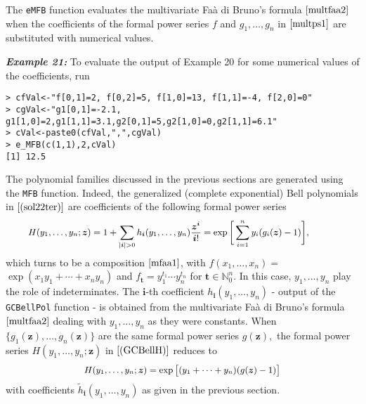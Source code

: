 The \texttt{eMFB} function evaluates the multivariate Faà di Bruno's
formula \(\eqref{multfaa2}\) when the coefficients of the formal power
series \(f\) and \(g_1, \ldots, g_n\) in \(\eqref{multps1}\) are
substituted with numerical values.

\hskip-0.5cm\textbf{\emph{Example 21:}} To evaluate the output of
Example 20 for some numerical values of the coefficients, run

\begin{verbatim}
> cfVal<-"f[0,1]=2, f[0,2]=5, f[1,0]=13, f[1,1]=-4, f[2,0]=0"
> cgVal<-"g1[0,1]=-2.1, g1[1,0]=2,g1[1,1]=3.1,g2[0,1]=5,g2[1,0]=0,g2[1,1]=6.1"
> cVal<-paste0(cfVal,",",cgVal)
> e_MFB(c(1,1),2,cVal)
[1] 12.5
\end{verbatim}

The polynomial families discussed in the previous sections are generated
using the \texttt{MFB} function. Indeed, the generalized (complete
exponential) Bell polynomials in \(\eqref{(sol22ter)}\) are coefficients
of the following formal power series \begin{equation}
\hskip-1cm{\small H(y_1, \ldots, y_n; \boldsymbol{z}) = 1 + \sum_{|\boldsymbol{i}| > 0} h_{\boldsymbol{i}}(y_1, \ldots, y_n) \frac{{\boldsymbol{z}}^{\boldsymbol{i}}}{\boldsymbol{i}!} = \exp \bigg[ \sum_{i=1}^n y_i (g_i(\boldsymbol{z})-1) \bigg]},
\label{(GCBellH)}
\end{equation} which turns to be a composition \(\eqref{mfaa1}\), with
\(f(x_1, \ldots, x_n) =\) \(\exp(x_1 y_1 + \cdots + x_n y_n)\) and
\(f_{\boldsymbol{t}} = y_1^{t_1} \cdots y_n^{t_n}\) for
\(\boldsymbol{t} \in {\mathbb N}_0^n.\) In this case,
\(y_1, \ldots, y_n\) play the role of indeterminates. The
\(\boldsymbol{i}\)-th coefficient
\(h_{\boldsymbol{i}}(y_1, \ldots, y_n)\) - output of the
\texttt{GCBellPol} function - is obtained from the multivariate Faà di
Bruno's formula \(\eqref{multfaa2}\) dealing with \(y_1, \ldots, y_n\)
as they were constants. When
\(\{g_1(\boldsymbol{z}), \ldots, g_n(\boldsymbol{z})\}\) are the same
formal power series \(g(\boldsymbol{z}),\) the formal power series
\(H(y_1, \ldots, y_n;\boldsymbol{z})\) in \(\eqref{(GCBellH)}\) reduces
to \begin{equation}
{\small H(y_1, \ldots, y_n; \boldsymbol{z}) = \exp \big[ (y_1 + \cdots + y_n) (g(\boldsymbol{z})-1) \big]}
\label{Hequal}
\end{equation} with coefficients
\(\tilde{h}_{\boldsymbol{i}}(y_1, \ldots, y_n)\) as given in the
previous section.

